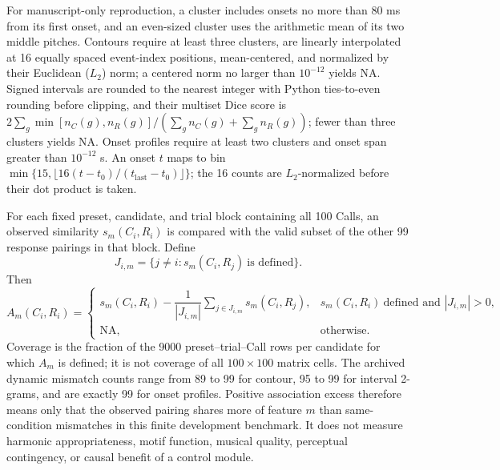 \documentclass[11pt,a4paper]{article}
\begin{document}
For manuscript-only reproduction, a cluster includes onsets no more than 80 ms from its first onset, and an even-sized cluster uses the arithmetic mean of its two middle pitches. Contours require at least three clusters, are linearly interpolated at 16 equally spaced event-index positions, mean-centered, and normalized by their Euclidean ($L_2$) norm; a centered norm no larger than $10^{-12}$ yields NA. Signed intervals are rounded to the nearest integer with Python ties-to-even rounding before clipping, and their multiset Dice score is $2\sum_g\min[n_C(g),n_R(g)]/(\sum_g n_C(g)+\sum_g n_R(g))$; fewer than three clusters yields NA. Onset profiles require at least two clusters and onset span greater than $10^{-12}$ s. An onset $t$ maps to bin $\min\{15,\lfloor16(t-t_0)/(t_{\mathrm{last}}-t_0)\rfloor\}$; the 16 counts are $L_2$-normalized before their dot product is taken.

For each fixed preset, candidate, and trial block containing all 100 Calls, an observed similarity $s_m(C_i,R_i)$ is compared with the valid subset of the other 99 response pairings in that block. Define
\begin{equation}
J_{i,m}=\{j\ne i:s_m(C_i,R_j)\ \text{is defined}\}.
\end{equation}
Then
\begin{equation}
A_m(C_i,R_i)=
\begin{cases}
s_m(C_i,R_i)-\dfrac{1}{|J_{i,m}|}\displaystyle\sum_{j\in J_{i,m}}s_m(C_i,R_j),
& s_m(C_i,R_i)\ \text{defined and }|J_{i,m}|>0,\\
\mathrm{NA}, & \text{otherwise}.
\end{cases}
\label{eq:association-excess}
\end{equation}
Coverage is the fraction of the 9000 preset--trial--Call rows per candidate for which $A_m$ is defined; it is not coverage of all $100\times100$ matrix cells. The archived dynamic mismatch counts range from 89 to 99 for contour, 95 to 99 for interval 2-grams, and are exactly 99 for onset profiles. Positive association excess therefore means only that the observed pairing shares more of feature $m$ than same-condition mismatches in this finite development benchmark. It does not measure harmonic appropriateness, motif function, musical quality, perceptual contingency, or causal benefit of a control module.
\end{document}
